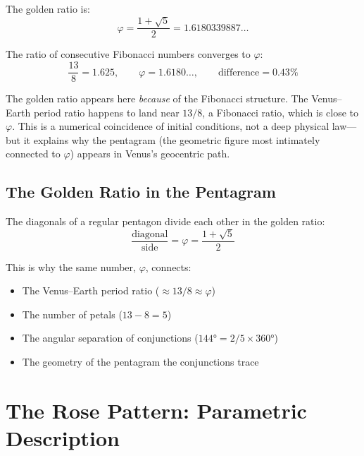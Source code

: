 \documentclass[11pt,letterpaper]{article}
\theoremstyle{definition}
\theoremstyle{plain}
\theoremstyle{remark}
\begin{document}
The golden ratio is:
\begin{equation}
  \varphi = \frac{1 + \sqrt{5}}{2} = 1.6180339887\ldots
  \label{eq:golden}
\end{equation}

The ratio of consecutive Fibonacci numbers converges to $\varphi$:
\begin{equation}
  \frac{13}{8} = 1.625,
  \qquad
  \varphi = 1.6180\ldots,
  \qquad
  \text{difference} = 0.43\%
  \label{eq:fib_golden}
\end{equation}

\begin{physicsintuition}
The golden ratio appears here \textit{because} of the Fibonacci
structure. The Venus--Earth period ratio happens to land near
$13/8$, a Fibonacci ratio, which is close to $\varphi$. This is
a numerical coincidence of initial conditions, not a deep physical
law—but it explains why the pentagram (the geometric figure most
intimately connected to $\varphi$) appears in Venus's geocentric
path.
\end{physicsintuition}

\subsection{The Golden Ratio in the Pentagram}

The diagonals of a regular pentagon divide each other in the
golden ratio:
\begin{equation}
  \frac{\text{diagonal}}{\text{side}} = \varphi = \frac{1+\sqrt{5}}{2}
\end{equation}

This is why the same number, $\varphi$, connects:
\begin{itemize}[nosep]
  \item The Venus--Earth period ratio ($\approx 13/8 \approx \varphi$)
  \item The number of petals ($13 - 8 = 5$)
  \item The angular separation of conjunctions ($144° = 2/5 \times 360°$)
  \item The geometry of the pentagram the conjunctions trace
\end{itemize}


\section{The Rose Pattern: Parametric Description}
\label{sec:rose}
\end{document}
